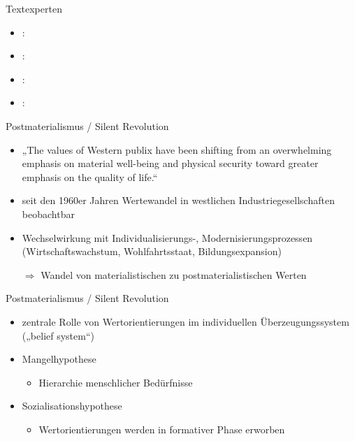 \documentclass[11pt]{beamer}
\begin{document}
\begin{frame}{Textexperten}
	\begin{itemize}
		\item \cite{Welzel2013}: 
		\item \cite{Inglehart2010}: 
		\item \cite{Scherer2020}:
		\item \cite{Welzel2009}:
	\end{itemize}
\end{frame}

\begin{frame}{Postmaterialismus / Silent Revolution \parencite{Inglehart1977}}
	\begin{itemize}
		\item „The values of Western publix have been shifting from an overwhelming emphasis on material well-being and physical security toward greater emphasis on the quality of life.“ \parencite[1]{Inglehart1977}
		\item seit den 1960er Jahren Wertewandel in westlichen Industriegesellschaften beobachtbar
		\item Wechselwirkung mit Individualisierungs-, Modernisierungsprozessen (Wirtschaftswachstum, Wohlfahrtsstaat, Bildungsexpansion)
		\item[$\Rightarrow$] Wandel von materialistischen zu postmaterialistischen Werten
	\end{itemize}		

\end{frame}

\begin{frame}{Postmaterialismus / Silent Revolution \parencite{Inglehart1977}}
	\begin{itemize}
		\item zentrale Rolle von Wertorientierungen im individuellen Überzeugungssystem („belief system“)
		\item Mangelhypothese
			\begin{itemize}
				\item Hierarchie menschlicher Bedürfnisse \parencite{Maslow1943}
			\end{itemize}
		\item Sozialisationshypothese
			\begin{itemize}
				\item Wertorientierungen werden in formativer Phase erworben
			\end{itemize}						
	\end{itemize}		
\end{frame}
\end{document}
